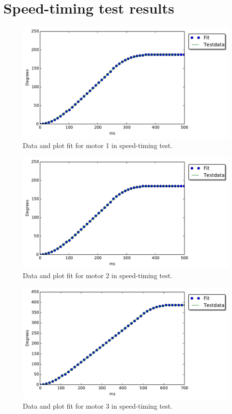 \chapter{Speed-timing test results}\label{app:res}
\begin{figure}[ht]
\includegraphics[width=\textwidth]{test_res/speed_tests/Data_and_fit_motor1.pdf}
\caption{Data and plot fit for motor 1 in speed-timing test.}
\label{fig:fit_1}
\end{figure}

\begin{figure}[ht]
\includegraphics[width=\textwidth]{test_res/speed_tests/Data_and_fit_motor2.pdf}
\caption{Data and plot fit for motor 2 in speed-timing test.}
\label{fig:fit_2}
\end{figure}

\begin{figure}[ht]
\includegraphics[width=\textwidth]{test_res/speed_tests/Data_and_fit_motor3.pdf}
\caption{Data and plot fit for motor 3 in speed-timing test.}
\label{fig:fit_3}
\end{figure}

